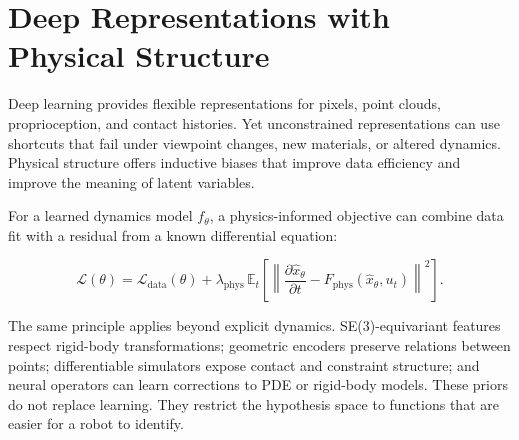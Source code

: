 \documentclass[11pt]{article}
\begin{document}
\section{Deep Representations with Physical Structure}
\label{sec:physics}

Deep learning provides flexible representations for pixels, point clouds,
proprioception, and contact histories. Yet unconstrained representations can
use shortcuts that fail under viewpoint changes, new materials, or altered
dynamics. Physical structure offers inductive biases that improve data
efficiency and improve the meaning of latent variables.

For a learned dynamics model $f_\theta$, a physics-informed objective can
combine data fit with a residual from a known differential equation:

\begin{equation}
  \mathcal{L}(\theta) = \mathcal{L}_{\mathrm{data}}(\theta)
  + \lambda_{\mathrm{phys}}\,
  \mathbb{E}_{t}\left[\left\|
    \frac{\partial \hat{x}_\theta}{\partial t}
    - F_{\mathrm{phys}}(\hat{x}_\theta,u_t)
  \right\|^2\right].
  \label{eq:physics-loss}
\end{equation}

The same principle applies beyond explicit dynamics. SE(3)-equivariant
features respect rigid-body transformations; geometric encoders preserve
relations between points; differentiable simulators expose contact and
constraint structure; and neural operators can learn corrections to PDE or
rigid-body models. These priors do not replace learning. They restrict the
hypothesis space to functions that are easier for a robot to identify.
\end{document}
